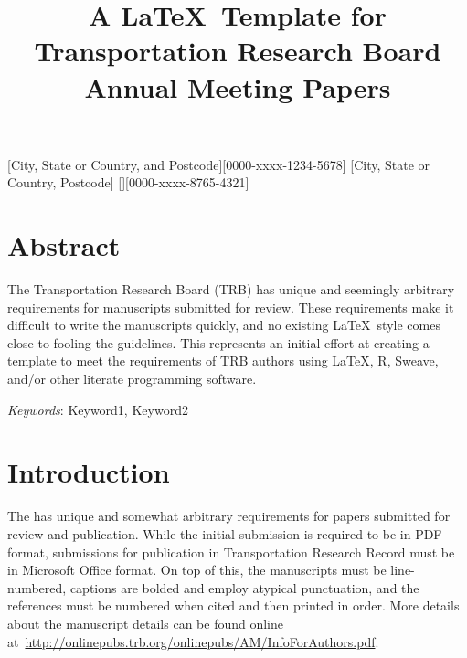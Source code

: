 \documentclass[numbered]{trbunofficial}
\begin{document}
\title{A \LaTeX\ Template for Transportation Research Board Annual Meeting Papers}

[City, State or Country, and Postcode][0000-xxxx-1234-5678]
[City, State or Country, Postcode]
[][0000-xxxx-8765-4321]



\maketitle

\section{Abstract}
The Transportation Research Board (TRB) has unique and seemingly arbitrary requirements for manuscripts submitted for review. These requirements make it difficult to write the manuscripts quickly, and no existing \LaTeX\ style comes close to fooling the guidelines. This represents an initial effort at creating a template to meet the requirements of TRB authors using \LaTeX, R, Sweave, and/or other literate programming software.

\hfill\break%
\noindent\textit{Keywords}: Keyword1, Keyword2
\newpage

\section{Introduction}
The \citep{TRBGuide} has unique and somewhat arbitrary requirements for papers submitted for review and publication. While the initial submission is required to be in PDF format, submissions for publication in Transportation Research Record must be in Microsoft Office format. On top of this, the manuscripts must be line-numbered, captions are bolded and employ atypical punctuation, and the references must be numbered when cited and then printed in order. More details about the manuscript details can be found online at~\url{http://onlinepubs.trb.org/onlinepubs/AM/InfoForAuthors.pdf}.
\end{document}

